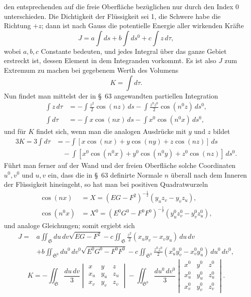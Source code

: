 \documentclass[11pt,a4paper,leqno]{article}
\begin{document}
den entsprechenden auf die freie Oberfläche bezüglichen nur durch
den Index 0 unterschieden. Die Dichtigkeit der Flüssigkeit sei 1,
die Schwere habe die Richtung $+z$; dann ist nach Gauss die
potentielle Energie aller wirkenden Kräfte
\[
J=a\int ds+b\int ds^0+c\int z\,d\tau,
\]
wobei $a,b,c$ Constante bedeuten, und jedes Integral über das
ganze Gebiet erstreckt ist, dessen Element in dem Integranden
vorkommt. Es ist also $J$ zum Extremum zu machen bei gegebenem
Werth des Volumens
\[
K=\int d\tau.
\]
Nun findet man mittelst der in \S~63 angewandten partiellen
Integration
\[
\begin{aligned}
\int z\,d\tau
&=-\int\frac{z^2}{2}\cos(nz)\,ds
-\int\frac{z^0z^0}{2}\cos(n^0z)\,ds^0,\\
\int d\tau
&=-\int x\cos(nx)\,ds
-\int x^0\cos(n^0x)\,ds^0,
\end{aligned}
\]
und für $K$ findet sich, wenn man die analogen Ausdrücke mit
$y$ und $z$ bildet
\[
\begin{aligned}
3K=3\int d\tau
&=-\int[x\cos(nx)+y\cos(ny)+z\cos(nz)]\,ds\\
&\quad-\int[x^0\cos(n^0x)+y^0\cos(n^0y)+z^0\cos(nz)]\,ds^0.
\end{aligned}
\]
Führt man ferner auf der Wand und der freien Oberfläche solche
Coordinaten $u^0,v^0$ und $u,v$ ein, dass die in \S~63 definirte Normale
$n$ überall nach dem Inneren der Flüssigkeit hineingeht, so
hat man bei positiven Quadratwurzeln
\[
\begin{aligned}
\cos(nx)&=X=(EG-F^2)^{-\frac12}(y_uz_v-y_vz_u),\\
\cos(n^0x)&=X^0=(E^0G^0-F^0F^0)^{-\frac12}
(y_u^0z_v^0-y_v^0z_u^0),
\end{aligned}
\]
und analoge Gleichungen; somit ergiebt sich
\[
\begin{aligned}
J={}&a\iint_{\mathfrak{S}}du\,dv\sqrt{EG-F^2}
-c\iint_{\mathfrak{S}}\frac{z^2}{2}(x_uy_v-x_vy_u)\,du\,dv\\
&+b\iint_{\mathfrak{S}^0}du^0\,dv^0\sqrt{E^0G^0-F^0F^0}
-c\iint_{\mathfrak{S}^0}\frac{z^0z^0}{2}
(x_u^0y_v^0-x_v^0y_u^0)\,du^0\,dv^0,
\end{aligned}
\]
\[
K=-\iint_{\mathfrak{S}}\frac{du\,dv}{3}
\begin{vmatrix}
x&y&z\\x_u&y_u&z_u\\x_v&y_v&z_v
\end{vmatrix}
-\iint_{\mathfrak{S}^0}\frac{du^0\,dv^0}{3}
\begin{vmatrix}
x^0&y^0&z^0\\x_u^0&y_u^0&z_u^0\\x_v^0&y_v^0&z_v^0
\end{vmatrix}.
\]
\end{document}
